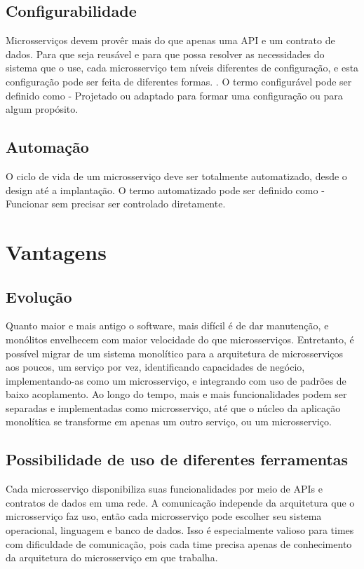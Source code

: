\subsection{Configurabilidade}

Microsserviços devem provêr mais do que apenas uma API e um contrato de dados. Para que seja reusável e para que possa resolver as necessidades do sistema que o use, cada microsserviço tem níveis diferentes de configuração, e esta configuração pode ser feita de diferentes formas. \cite{Familiar2015}. O termo configurável pode ser definido como - Projetado ou adaptado para formar uma configuração ou para algum propósito.

\subsection {Automação}

O ciclo de vida de um microsserviço deve ser totalmente automatizado, desde o design até a implantação. O termo automatizado pode ser definido como - Funcionar sem precisar ser controlado diretamente.

\section{Vantagens}

\subsection{Evolução}

Quanto maior e mais antigo o software, mais difícil é de dar manutenção, e monólitos envelhecem com maior velocidade do que microsserviços. Entretanto, é possível migrar de um sistema monolítico para a arquitetura de microsserviços aos poucos, um serviço por vez, identificando capacidades de negócio, implementando-as como um microsserviço, e integrando com uso de padrões de baixo acoplamento. Ao longo do tempo, mais e mais funcionalidades podem ser separadas e implementadas como microsserviço, até que o núcleo da aplicação monolítica se transforme em apenas um outro serviço, ou um microsserviço. \cite{Familiar2015}

\subsection{Possibilidade de uso de diferentes ferramentas}

Cada microsserviço disponibiliza suas funcionalidades por meio de APIs e contratos de dados em uma rede. A comunicação independe da arquitetura que o microsserviço faz uso, então cada microsserviço pode escolher seu sistema operacional, linguagem e banco de dados. Isso é especialmente valioso para times com dificuldade de comunicação, pois cada time precisa apenas de conhecimento da arquitetura do microsserviço em que trabalha. \cite{Familiar2015}

